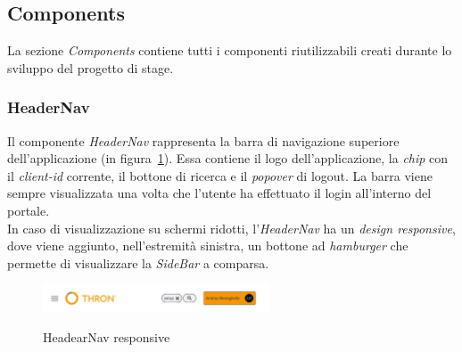 \subsection{Components}\label{subsec:components}
La sezione \textit{Components} contiene tutti i componenti riutilizzabili creati durante lo sviluppo del progetto di stage.
\subsubsection{HeaderNav}\label{subsubsec:header-nav}
Il componente \textit{HeaderNav} rappresenta la barra di navigazione superiore dell'applicazione (in figura~\ref{fig:header-nav-responsive}). Essa contiene il logo dell'applicazione, la \textit{chip} con il \textit{client-id}
corrente, il bottone di ricerca e il \textit{popover} di logout. 
La barra viene sempre visualizzata una volta che l'utente ha effettuato il login all'interno del portale.\\
In caso di visualizzazione su schermi ridotti, l'\textit{HeaderNav} ha un \textit{design responsive}, dove viene aggiunto, nell'estremità sinistra, un bottone ad \textit{hamburger}
che permette di visualizzare la \textit{SideBar} a comparsa.

\begin{figure}[ht]
  \centering
  \includegraphics[width=0.6\textwidth, alt={Barra di navigazione superiore con design responsive}]{images/frontend/HeaderRes.jpg}
  \caption{HeadearNav responsive}\label{fig:header-nav-responsive}
\end{figure}

